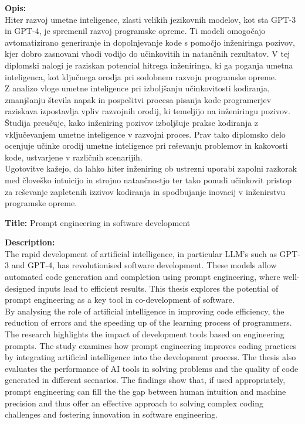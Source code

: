 \documentclass[a4paper,12pt,openright]{book}
\newcommand{\ttitleEn}{Prompt engineering in software development}
\begin{document}
\bigskip
\noindent\textbf{Opis:}\\
Hiter razvoj umetne inteligence, zlasti velikih jezikovnih modelov, kot sta GPT-3 in GPT-4, je spremenil razvoj programske opreme. Ti modeli omogočajo avtomatizirano generiranje in dopolnjevanje kode s pomočjo inženiringa pozivov, kjer dobro zasnovani vhodi vodijo do učinkovitih in natančnih rezultatov. V tej diplomski nalogi je raziskan potencial hitrega inženiringa, ki ga poganja umetna inteligenca, kot ključnega orodja pri sodobnem razvoju programske opreme. \\
Z analizo vloge umetne inteligence pri izboljšanju učinkovitosti kodiranja, zmanjšanju števila napak in pospešitvi procesa pisanja kode programerjev raziskava izpostavlja vpliv razvojnih orodij, ki temeljijo na inženiringu pozivov. Študija preučuje, kako inženiring pozivov izboljšuje prakse kodiranja z vključevanjem umetne inteligence v razvojni proces. Prav tako diplomsko delo ocenjuje učinke orodij umetne inteligence pri reševanju problemov in kakovosti kode, ustvarjene v različnih scenarijih. \\
Ugotovitve kažejo, da lahko hiter inženiring ob ustrezni uporabi zapolni razkorak med človeško intuicijo in strojno natančnostjo ter tako ponudi učinkovit pristop za reševanje zapletenih izzivov kodiranja in spodbujanje inovacij v inženirstvu programske opreme.

\bigskip
\pagebreak
\noindent\textbf{Title:} \ttitleEn

\bigskip
\noindent\textbf{Description:}\\
The rapid development of artificial intelligence, in particular LLM's such as
GPT-3 and GPT-4, has revolutionised software development. These models
allow automated code generation and completion using prompt engineering, where well-designed inputs lead to efficient results. This thesis explores the potential of prompt engineering as a key tool in co-development of software. \\
By analysing the role of artificial intelligence in improving code efficiency,
the reduction of errors and the speeding up of the learning process of programmers.
The research highlights the impact of development tools based on
engineering prompts. The study examines how prompt engineering improves
coding practices by integrating artificial intelligence into the development process.
The thesis also evaluates the performance of AI tools in solving
problems and the quality of code generated in different scenarios.
The findings show that, if used appropriately, prompt engineering can fill the
the gap between human intuition and machine precision and thus offer an effective
approach to solving complex coding challenges and fostering innovation in
software engineering.
\bigskip
\end{document}
